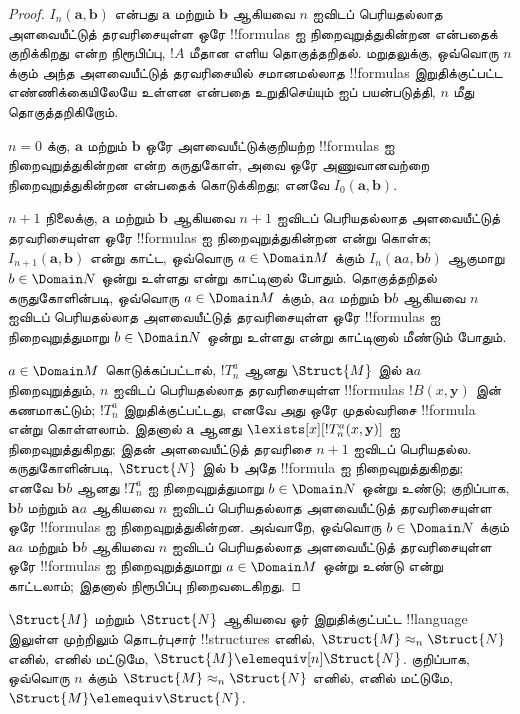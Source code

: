 \documentclass[../../../include/open-logic-section]{subfiles}
\begin{document}
\begin{proof}
  $I_n(\mathbf{a},\mathbf{b})$ என்பது $\mathbf{a}$ மற்றும்
  $\mathbf{b}$ ஆகியவை $n$ ஐவிடப் பெரியதல்லாத அளவையீட்டுத்
  தரவரிசையுள்ள ஒரே !!{formula}s ஐ நிறைவுறுத்துகின்றன என்பதைக்
  குறிக்கிறது என்ற நிரூபிப்பு, $!A$ மீதான எளிய தொகுத்தறிதல்.
  மறுதலுக்கு, ஒவ்வொரு $n$ க்கும் அந்த அளவையீட்டுத் தரவரிசையில்
  சமானமல்லாத !!{formula}s இறுதிக்குட்பட்ட எண்ணிக்கையிலேயே உள்ளன
  என்பதை உறுதிசெய்யும்  ஐப் பயன்படுத்தி,
  $n$ மீது தொகுத்தறிகிறோம்.

  $n=0$ க்கு, $\mathbf{a}$ மற்றும் $\mathbf{b}$ ஒரே
  அளவையீட்டுக்குறியற்ற !!{formula}s ஐ நிறைவுறுத்துகின்றன என்ற
  கருதுகோள், அவை ஒரே அணுவானவற்றை நிறைவுறுத்துகின்றன என்பதைக் கொடுக்கிறது;
  எனவே $I_0(\mathbf{a},\mathbf{b})$.

  $n+1$ நிலைக்கு, $\mathbf{a}$ மற்றும் $\mathbf{b}$ ஆகியவை
  $n+1$ ஐவிடப் பெரியதல்லாத அளவையீட்டுத் தரவரிசையுள்ள ஒரே
  !!{formula}s ஐ நிறைவுறுத்துகின்றன என்று கொள்க;
  $I_{n+1}(\mathbf{a},\mathbf{b})$ என்று காட்ட, ஒவ்வொரு
  $a \in \Domain M$ க்கும் $I_n(\mathbf{a}a,\mathbf{b}b)$ ஆகுமாறு
  $b \in
  \Domain N$ ஒன்று உள்ளது என்று காட்டினால் போதும். தொகுத்தறிதல்
  கருதுகோளின்படி, ஒவ்வொரு $a \in
  \Domain M$ க்கும், $\mathbf{a}a$ மற்றும் $\mathbf{b}b$ ஆகியவை
  $n$ ஐவிடப் பெரியதல்லாத அளவையீட்டுத் தரவரிசையுள்ள ஒரே
  !!{formula}s ஐ நிறைவுறுத்துமாறு $b \in \Domain N$ ஒன்று உள்ளது
  என்று காட்டினால் மீண்டும் போதும்.

  $a \in \Domain M$ கொடுக்கப்பட்டால், $!T^a_n$ ஆனது
  $\Struct{M}$ இல் $\mathbf{a}a$ நிறைவுறுத்தும், $n$ ஐவிடப்
  பெரியதல்லாத தரவரிசையுள்ள !!{formula}s $!B(x,\mathbf{y})$ இன்
  கணமாகட்டும்; $!T^a_n$ இறுதிக்குட்பட்டது, எனவே அது ஒரே முதல்வரிசை
  !!{formula} என்று கொள்ளலாம். இதனால் $\mathbf{a}$ ஆனது
  $\lexists[x][!T^a_n(x,\mathbf{y})]$ ஐ நிறைவுறுத்துகிறது; இதன்
  அளவையீட்டுத் தரவரிசை $n+1$ ஐவிடப் பெரியதல்ல. கருதுகோளின்படி,
  $\Struct{N}$ இல் $\mathbf{b}$ அதே !!{formula} ஐ நிறைவுறுத்துகிறது;
  எனவே $\mathbf{b}b$ ஆனது $!T^a_n$ ஐ நிறைவுறுத்துமாறு
  $b \in \Domain N$ ஒன்று உண்டு; குறிப்பாக, $\mathbf{b}b$ மற்றும்
  $\mathbf{a}a$ ஆகியவை $n$ ஐவிடப் பெரியதல்லாத அளவையீட்டுத்
  தரவரிசையுள்ள ஒரே !!{formula}s ஐ நிறைவுறுத்துகின்றன. அவ்வாறே,
  ஒவ்வொரு $b \in \Domain N$ க்கும் $\mathbf{a}a$ மற்றும்
  $\mathbf{b}b$ ஆகியவை $n$ ஐவிடப் பெரியதல்லாத அளவையீட்டுத்
  தரவரிசையுள்ள ஒரே !!{formula}s ஐ நிறைவுறுத்துமாறு
  $a\in \Domain M$ ஒன்று உண்டு என்று காட்டலாம்; இதனால் நிரூபிப்பு
  நிறைவடைகிறது.
\end{proof}

\begin{cor}
  $\Struct{M}$ மற்றும் $\Struct{N}$ ஆகியவை ஓர் இறுதிக்குட்பட்ட
  !!{language} இலுள்ள முற்றிலும் தொடர்புசார் !!{structure}s எனில்,
  $\Struct{M} \approx_n\Struct{N}$ எனில், எனில் மட்டுமே,
  $\Struct{M} \elemequiv[n] \Struct{N}$. குறிப்பாக, ஒவ்வொரு $n$
  க்கும் $\Struct{M} \approx_n \Struct{N}$ எனில், எனில் மட்டுமே,
  $\Struct{M} \elemequiv \Struct{N}$.
\end{cor}
\end{document}
